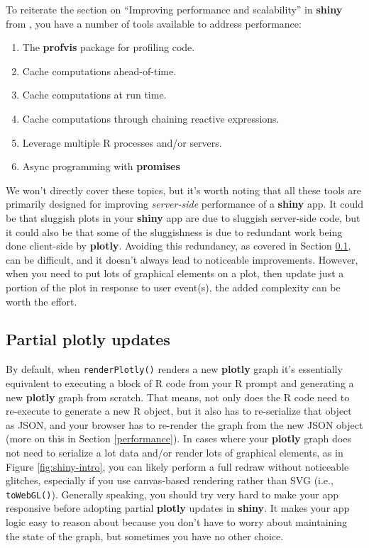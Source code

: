 \documentclass[
  12pt,
]{krantz}
\providecommand{\tightlist}{%
  \setlength{\itemsep}{0pt}\setlength{\parskip}{0pt}}
\begin{document}
To reiterate the section on ``Improving performance and scalability'' in \textbf{shiny} from \citet{async}, you have a number of tools available to address performance:

\begin{enumerate}
\def\labelenumi{\arabic{enumi}.}
\tightlist
\item
  The \textbf{profvis} package for profiling code.
\item
  Cache computations ahead-of-time.
\item
  Cache computations at run time.
\item
  Cache computations through chaining reactive expressions.
\item
  Leverage multiple R processes and/or servers.
\item
  Async programming with \textbf{promises}
\end{enumerate}

We won't directly cover these topics, but it's worth noting that all these tools are primarily designed for improving \emph{server-side} performance of a \textbf{shiny} app. It could be that sluggish plots in your \textbf{shiny} app are due to sluggish server-side code, but it could also be that some of the sluggishness is due to redundant work being done client-side by \textbf{plotly}. Avoiding this redundancy, as covered in Section \ref{proxies}, can be difficult, and it doesn't always lead to noticeable improvements. However, when you need to put lots of graphical elements on a plot, then update just a portion of the plot in response to user event(s), the added complexity can be worth the effort.

\hypertarget{proxies}{%
\subsection{Partial plotly updates}\label{proxies}}

By default, when \texttt{renderPlotly()} renders a new \textbf{plotly} graph it's essentially equivalent to executing a block of R code from your R prompt and generating a new \textbf{plotly} graph from scratch. That means, not only does the R code need to re-execute to generate a new R object, but it also has to re-serialize that object as JSON, and your browser has to re-render the graph from the new JSON object (more on this in Section \ref{performance}). In cases where your \textbf{plotly} graph does not need to serialize a lot data and/or render lots of graphical elements, as in Figure \ref{fig:shiny-intro}, you can likely perform a full redraw without noticeable glitches, especially if you use canvas-based rendering rather than SVG (i.e., \texttt{toWebGL()}). Generally speaking, you should try very hard to make your app responsive before adopting partial \textbf{plotly} updates in \textbf{shiny}. It makes your app logic easy to reason about because you don't have to worry about maintaining the state of the graph, but sometimes you have no other choice.
\end{document}

